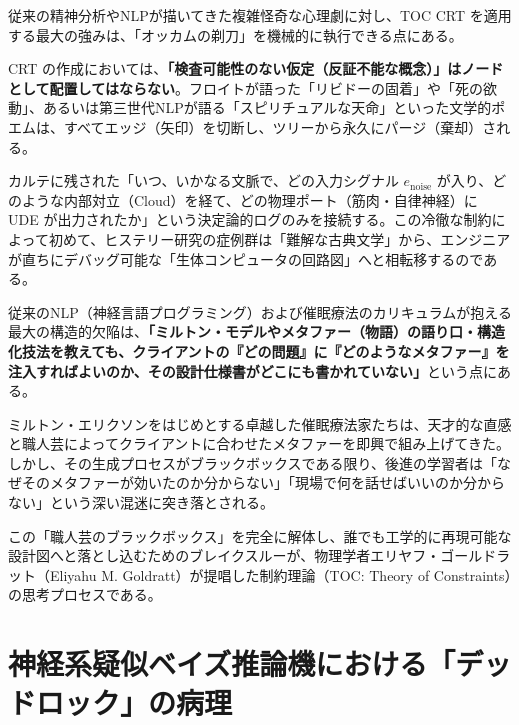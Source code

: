 従来の精神分析やNLPが描いてきた複雑怪奇な心理劇に対し、TOC CRT を適用する最大の強みは、「オッカムの剃刀」を機械的に執行できる点にある。

CRT の作成においては、\textbf{「検査可能性のない仮定（反証不能な概念）」はノードとして配置してはならない}。フロイトが語った「リビドーの固着」や「死の欲動」、あるいは第三世代NLPが語る「スピリチュアルな天命」といった文学的ポエムは、すべてエッジ（矢印）を切断し、ツリーから永久にパージ（棄却）される。

カルテに残された「いつ、いかなる文脈で、どの入力シグナル $e_{\mathrm{noise}}$ が入り、どのような内部対立（Cloud）を経て、どの物理ポート（筋肉・自律神経）に UDE が出力されたか」という決定論的ログのみを接続する。この冷徹な制約によって初めて、ヒステリー研究の症例群は「難解な古典文学」から、エンジニアが直ちにデバッグ可能な「生体コンピュータの回路図」へと相転移するのである。
%
%
%

従来のNLP（神経言語プログラミング）および催眠療法のカリキュラムが抱える最大の構造的欠陥は、\textbf{「ミルトン・モデルやメタファー（物語）の語り口・構造化技法を教えても、クライアントの『どの問題』に『どのようなメタファー』を注入すればよいのか、その設計仕様書がどこにも書かれていない」}という点にある。

ミルトン・エリクソンをはじめとする卓越した催眠療法家たちは、天才的な直感と職人芸によってクライアントに合わせたメタファーを即興で組み上げてきた。
しかし、その生成プロセスがブラックボックスである限り、後進の学習者は「なぜそのメタファーが効いたのか分からない」「現場で何を話せばいいのか分からない」という深い混迷に突き落とされる。

この「職人芸のブラックボックス」を完全に解体し、誰でも工学的に再現可能な設計図へと落とし込むためのブレイクスルーが、物理学者エリヤフ・ゴールドラット（Eliyahu M. Goldratt）が提唱した制約理論（TOC: Theory of Constraints）の思考プロセスである。

\section{神経系疑似ベイズ推論機における「デッドロック」の病理}

